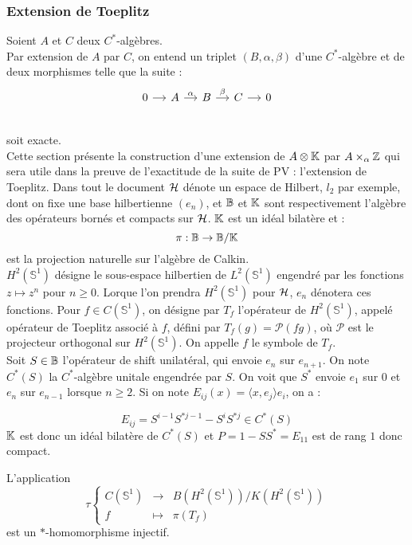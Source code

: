 \subsubsection{Extension de Toeplitz}


Soient $A$ et $C$ deux $C^*$-algèbres. \\
Par extension de $A$ par $C$, on entend un triplet $(B,\alpha,\beta)$ d'une $C^*$-algèbre et de deux morphismes telle que la suite :
\[\begin{tikzcd}[column sep =small] 
0 \arrow{r}  & A \arrow{r}{\alpha}  &  B \arrow{r}{\beta}  & C \arrow{r}& 0 \\ 
\end{tikzcd}\]
soit exacte.\\

Cette section présente la construction d'une extension de $A\otimes \mathbb K$ par $A\times_\alpha \mathbb Z$ qui sera utile dans la preuve de l'exactitude de la suite de PV : l'extension de Toeplitz. Dans tout le document $\mathcal H$ dénote un espace de Hilbert, $l_2$ par exemple, dont on fixe une base hilbertienne $(e_n)$, et $\mathbb B$ et $\mathbb K$ sont respectivement l'algèbre des opérateurs bornés et compacts sur $\mathcal H$. $\mathbb K$ est un idéal bilatère et :
\[\pi : \mathbb B \rightarrow \mathbb B / \mathbb K\]
est la projection naturelle sur l'algèbre de Calkin. \\
$H^2(\mathbb S^1)$ désigne le sous-espace hilbertien de $L^2(\mathbb S ^1)$ engendré par les fonctions $z \mapsto z^n$ pour $n\geq 0$. Lorque l'on prendra $H^2(\mathbb S^1)$ pour $\mathcal H$, $e_n$ dénotera ces fonctions. Pour $f\in C(\mathbb S^1)$, on désigne par $T_f$ l'opérateur de $H^2(\mathbb S^1)$, appelé opérateur de Toeplitz associé à $f$, défini par $T_f(g)=\mathcal P(fg)$, où $\mathcal P$ est le projecteur orthogonal sur $H^2(\mathbb S^1)$. On appelle $f$ le symbole de $T_f$.\\

Soit $S\in \mathbb B$ l'opérateur de shift unilatéral, qui envoie $e_n$ sur $e_{n+1}$. On note $C^*(S)$ la $C^*$-algèbre unitale engendrée par $S$. On voit que $S^*$ envoie $e_1$ sur $0$ et $e_n$ sur $e_{n-1}$ lorsque $n\geq 2$. Si on note $E_{ij}(x)=\langle x,e_j\rangle e_i$, on a :

\[E_{ij} = S^{i-1}S^{*j-1}-S^{i}S^{*j}\in C^*(S)\]
$\mathbb K $ est donc un idéal bilatère de $C^*(S)$ et $P=1-SS^* = E_{11}$ est de rang $1$ donc compact.\\

\begin{lem}
L'application 
\[\tau \left\{\begin{array}{rcl} C(\mathbb S^1)  & \rightarrow & B(H^2(\mathbb S^1))/K(H^2(\mathbb S^1)) \\ 
f & \mapsto & \pi(T_f)\end{array}\right.\]
est un $*$-homomorphisme injectif.
\end{lem}

